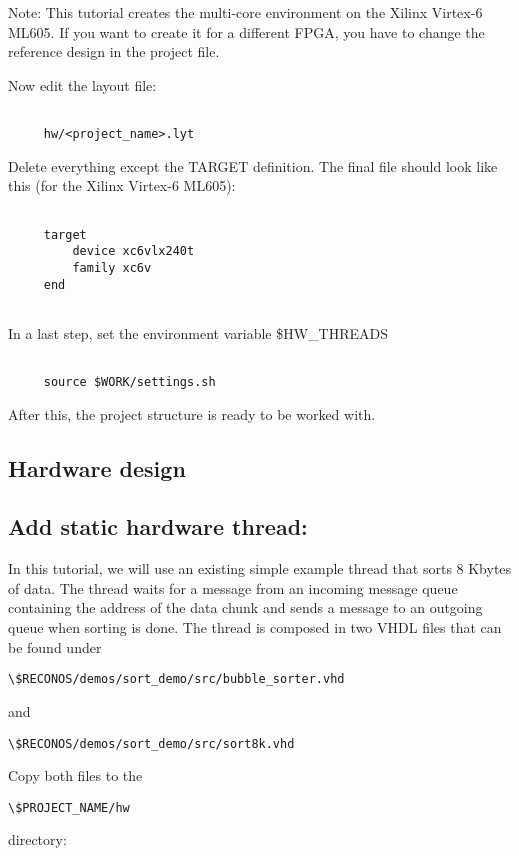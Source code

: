 \documentclass[DIV15,a4paper]{scrartcl}
\begin{document}
Note: This tutorial creates the multi-core environment on the Xilinx Virtex-6 ML605. If you want to create it for a different FPGA, you have to change the reference design in the project file.

Now edit the layout file:

\begin{verbatim}

     hw/<project_name>.lyt

\end{verbatim}
     
Delete everything except the TARGET definition. The final file should look like this (for the Xilinx Virtex-6 ML605):


\begin{verbatim}

     target
         device xc6vlx240t
         family xc6v
     end
     
\end{verbatim}

In a last step, set the environment variable \$HW\_THREADS

\begin{verbatim}

     source $WORK/settings.sh

\end{verbatim}
     
After this, the project structure is ready to be worked with.


\subsection{Hardware design}


\subsection*{Add static hardware thread:}

In this tutorial, we will use an existing simple example thread that sorts 8 Kbytes of data.
The thread waits for a message from an incoming message queue containing the address of the data chunk and sends a
message to an outgoing queue when sorting is done. The thread is composed in two VHDL files that can be found under
\begin{verbatim}\$RECONOS/demos/sort_demo/src/bubble_sorter.vhd\end{verbatim}
and \begin{verbatim}\$RECONOS/demos/sort_demo/src/sort8k.vhd\end{verbatim}
Copy both files to the
\begin{verbatim}\$PROJECT_NAME/hw\end{verbatim} directory:
\end{document}
